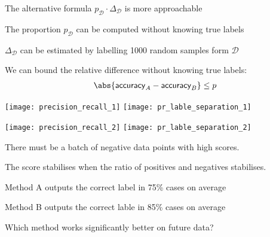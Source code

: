 \documentclass[landscape,footrule]{foils}
\begin{document}

The alternative formula $p_\mathcal{D}\cdot \Delta_\mathcal{D}$ is more approachable
\begin{triangles}
\item The proportion $p_\mathcal{D}$ can be computed without knowing true labels
\item $\Delta_\mathcal{D}$ can be estimated by labelling 1000 random samples form $\mathcal{D}$
\end{triangles}
\vspace*{1cm}

We can bound the relative difference without knowing true labels:
\begin{align*}
\abs{\mathsf{accuracy}_A-\mathsf{accuracy}_B}\leq p
\end{align*}


\centerline{\texttt{[image: precision\_recall\_1]}\hspace{0cm} \texttt{[image: pr\_lable\_separation\_1]}}


\centerline{\texttt{[image: precision\_recall\_2]}\hspace{0cm} \texttt{[image: pr\_lable\_separation\_2]}}

\begin{triangles}
\item  There must be a batch of negative data points with high scores.
\item  The score stabilises when the ratio of positives and negatives stabilises.
\end{triangles}



\begin{triangles}
\item Method A outputs the correct label in 75\% cases on average
\item Method B outputs the correct lable in 85\% cases on average
\item Which method works significantly better on future data? 
\end{triangles} 

\end{document}
